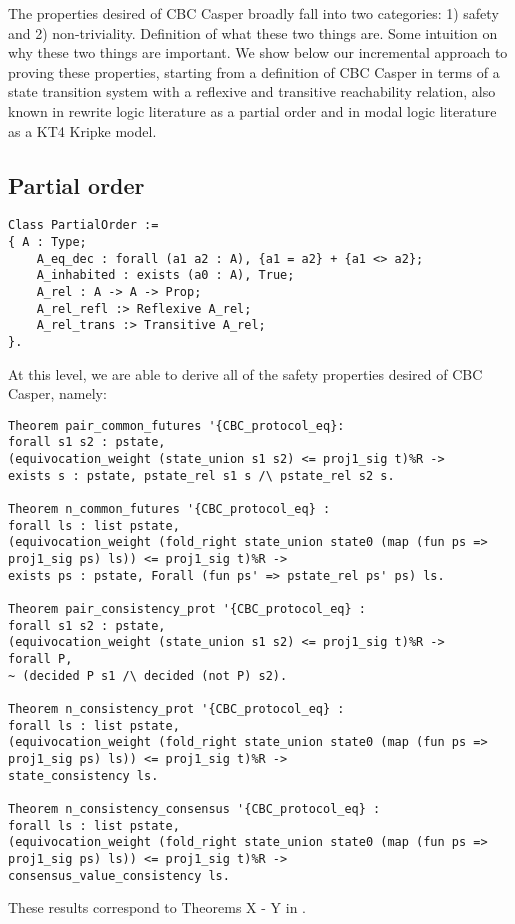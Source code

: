 The properties desired of CBC Casper broadly fall into two categories: 1) safety and 2) non-triviality. Definition of what these two things are. Some intuition on why these two things are important. We show below our incremental approach to proving these properties, starting from a definition of CBC Casper in terms of a state transition system with a reflexive and transitive reachability relation, also known in rewrite logic literature as a partial order and in modal logic literature as a KT4 Kripke model.
\subsection{Partial order}
\begin{lstlisting}
Class PartialOrder :=
{ A : Type;
	A_eq_dec : forall (a1 a2 : A), {a1 = a2} + {a1 <> a2};
	A_inhabited : exists (a0 : A), True;
	A_rel : A -> A -> Prop;
	A_rel_refl :> Reflexive A_rel;
	A_rel_trans :> Transitive A_rel;
}.
\end{lstlisting}
At this level, we are able to derive all of the safety properties desired of CBC Casper, namely:
\begin{lstlisting}
Theorem pair_common_futures '{CBC_protocol_eq}:
forall s1 s2 : pstate,
(equivocation_weight (state_union s1 s2) <= proj1_sig t)%R ->
exists s : pstate, pstate_rel s1 s /\ pstate_rel s2 s.

Theorem n_common_futures '{CBC_protocol_eq} :
forall ls : list pstate,
(equivocation_weight (fold_right state_union state0 (map (fun ps => proj1_sig ps) ls)) <= proj1_sig t)%R ->
exists ps : pstate, Forall (fun ps' => pstate_rel ps' ps) ls.

Theorem pair_consistency_prot '{CBC_protocol_eq} :
forall s1 s2 : pstate,
(equivocation_weight (state_union s1 s2) <= proj1_sig t)%R ->
forall P,
~ (decided P s1 /\ decided (not P) s2).

Theorem n_consistency_prot '{CBC_protocol_eq} :
forall ls : list pstate,
(equivocation_weight (fold_right state_union state0 (map (fun ps => proj1_sig ps) ls)) <= proj1_sig t)%R ->
state_consistency ls.

Theorem n_consistency_consensus '{CBC_protocol_eq} :
forall ls : list pstate,
(equivocation_weight (fold_right state_union state0 (map (fun ps => proj1_sig ps) ls)) <= proj1_sig t)%R ->
consensus_value_consistency ls.
\end{lstlisting}
These results correspond to Theorems X - Y in \cite{CBCfull}.
\newline


